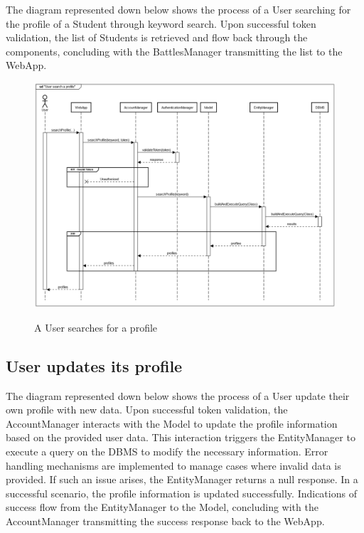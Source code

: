 \documentclass{Configuration_Files/Template}
\begin{document}
The diagram represented down below shows the process of a User searching for the profile of a Student through keyword search. Upon successful token validation, the list of Students is retrieved and flow back through the components, concluding with the BattlesManager transmitting the list to the WebApp.

\begin{figure}[H]
\centering
\includegraphics[scale = 0.33]{Images/diagrams/sequences/searchProfile.png}\\
\caption{A User searches for a profile}
\end{figure}

\subsection*{User updates its profile}

The diagram represented down below shows the process of a User update their own profile with new data. Upon successful token validation, the AccountManager interacts with the Model to update the profile information based on the provided user data. This interaction triggers the EntityManager to execute a query on the DBMS to modify the necessary information. Error handling mechanisms are implemented to manage cases where invalid data is provided. If such an issue arises, the EntityManager returns a null response. In a successful scenario, the profile information is updated successfully. Indications of success flow from the EntityManager to the Model, concluding with the AccountManager transmitting the success response back to the WebApp.
\end{document}
